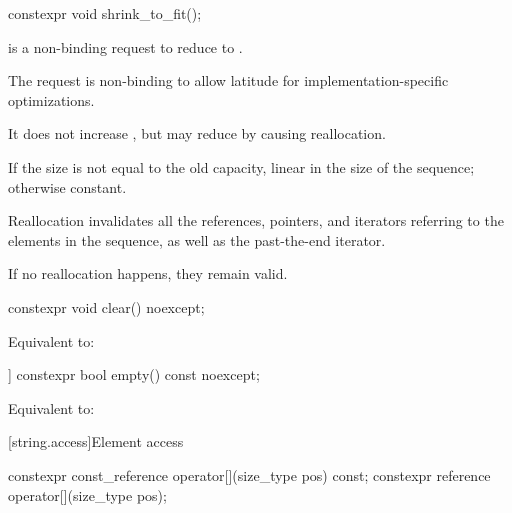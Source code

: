 %
\begin{itemdecl}
constexpr void shrink_to_fit();
\end{itemdecl}

\begin{itemdescr}
\pnum
\effects
{} is a non-binding request to reduce
 to .
\begin{note}
The request is non-binding to
allow latitude for implementation-specific optimizations.
\end{note}
It does not increase , but may reduce 
by causing reallocation.

\pnum
\complexity
If the size is not equal to the old capacity,
linear in the size of the sequence;
otherwise constant.

\pnum
\remarks
Reallocation invalidates all the references, pointers, and iterators
referring to the elements in the sequence, as well as the past-the-end iterator.
\begin{note}
If no reallocation happens, they remain valid.
\end{note}
\end{itemdescr}

%
\begin{itemdecl}
constexpr void clear() noexcept;
\end{itemdecl}

\begin{itemdescr}
\pnum
\effects
Equivalent to: 
\end{itemdescr}

%
\begin{itemdecl}
[[nodiscard]] constexpr bool empty() const noexcept;
\end{itemdecl}

\begin{itemdescr}
\pnum
\effects
Equivalent to:
\end{itemdescr}

[string.access]{Element access}

%
\begin{itemdecl}
constexpr const_reference operator[](size_type pos) const;
constexpr reference       operator[](size_type pos);
\end{itemdecl}

